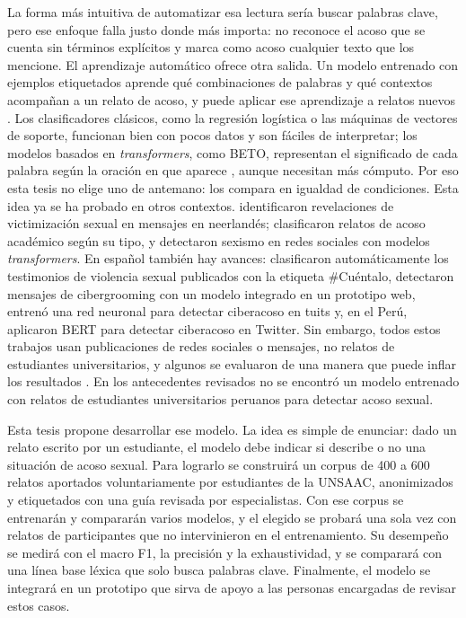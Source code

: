 La forma más intuitiva de automatizar esa lectura sería buscar palabras clave, pero ese enfoque falla justo donde más importa: no reconoce el acoso que se cuenta sin términos explícitos y marca como acoso cualquier texto que los mencione. El aprendizaje automático ofrece otra salida. Un modelo entrenado con ejemplos etiquetados aprende qué combinaciones de palabras y qué contextos acompañan a un relato de acoso, y puede aplicar ese aprendizaje a relatos nuevos \citep{salawu2020}. Los clasificadores clásicos, como la regresión logística o las máquinas de vectores de soporte, funcionan bien con pocos datos y son fáciles de interpretar; los modelos basados en \textit{transformers}, como BETO, representan el significado de cada palabra según la oración en que aparece \citep{devlin2019, canete2020}, aunque necesitan más cómputo. Por eso esta tesis no elige uno de antemano: los compara en igualdad de condiciones. Esta idea ya se ha probado en otros contextos. \citet{gorissen2023} identificaron revelaciones de victimización sexual en mensajes en neerlandés; \citet{wijaya2022} clasificaron relatos de acoso académico según su tipo, y \citet{mohammadi2024} detectaron sexismo en redes sociales con modelos \textit{transformers}. En español también hay avances: \citet{escobar2022} clasificaron automáticamente los testimonios de violencia sexual publicados con la etiqueta \#Cuéntalo, \citet{imbaquinga2025} detectaron mensajes de cibergrooming con un modelo integrado en un prototipo web, \citet{cumba2018} entrenó una red neuronal para detectar ciberacoso en tuits y, en el Perú, \citet{aguirre2022} aplicaron BERT para detectar ciberacoso en Twitter. Sin embargo, todos estos trabajos usan publicaciones de redes sociales o mensajes, no relatos de estudiantes universitarios, y algunos se evaluaron de una manera que puede inflar los resultados \citep{kapoor2023}. En los antecedentes revisados no se encontró un modelo entrenado con relatos de estudiantes universitarios peruanos para detectar acoso sexual.

Esta tesis propone desarrollar ese modelo. La idea es simple de enunciar: dado un relato escrito por un estudiante, el modelo debe indicar si describe o no una situación de acoso sexual. Para lograrlo se construirá un corpus de 400 a 600 relatos aportados voluntariamente por estudiantes de la UNSAAC, anonimizados y etiquetados con una guía revisada por especialistas. Con ese corpus se entrenarán y compararán varios modelos, y el elegido se probará una sola vez con relatos de participantes que no intervinieron en el entrenamiento. Su desempeño se medirá con el macro F1, la precisión y la exhaustividad, y se comparará con una línea base léxica que solo busca palabras clave. Finalmente, el modelo se integrará en un prototipo que sirva de apoyo a las personas encargadas de revisar estos casos.

